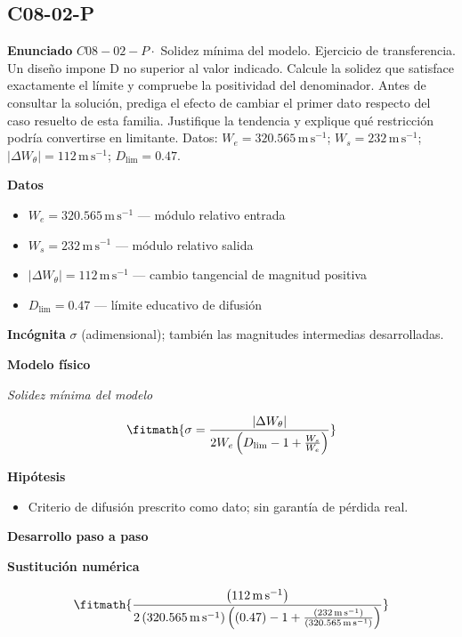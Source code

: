 \documentclass[10pt,openany]{book}
\begin{document}
\subsection*{C08-02-P}

\noindent\textbf{Enunciado}
\(C08-02-P \cdot\) Solidez mínima del modelo. Ejercicio de transferencia. Un diseño impone D no superior al valor indicado. Calcule la solidez que satisface exactamente el límite y compruebe la positividad del denominador. Antes de consultar la solución, prediga el efecto de cambiar el primer dato respecto del caso resuelto de esta familia. Justifique la tendencia y explique qué restricción podría convertirse en limitante. Datos: \(W_e=320.565\, \mathrm{m}\,\mathrm{s}^{-1}\); \(W_s=232\, \mathrm{m}\,\mathrm{s}^{-1}\); \(|\Delta W_\theta|=112\, \mathrm{m}\,\mathrm{s}^{-1}\); \(D_{\mathrm{lim}}=0.47\).

\noindent\textbf{Datos}
\begin{itemize}
\item $W_e = 320.565\,\mathrm{m}\,\mathrm{s}^{-1}$ — módulo relativo entrada
\item $W_s = 232\,\mathrm{m}\,\mathrm{s}^{-1}$ — módulo relativo salida
\item $|\Delta W_\theta| = 112\,\mathrm{m}\,\mathrm{s}^{-1}$ — cambio tangencial de magnitud positiva
\item $D_{\mathrm{lim}} = 0.47$ — límite educativo de difusión
\end{itemize}

\noindent\textbf{Incógnita}
$\sigma$ (adimensional); también las magnitudes intermedias desarrolladas.

\noindent\textbf{Modelo físico}

\noindent\textit{Solidez mínima del modelo}

\[
\fitmath{\sigma=\frac{|\Delta W_\theta|}{2 W_e \left(D_{\mathrm{lim}} - 1 + \frac{W_s}{W_e}\right)}}
\]

\noindent\textbf{Hipótesis}
\begin{itemize}
\item Criterio de difusión prescrito como dato; sin garantía de pérdida real.
\end{itemize}

\noindent\textbf{Desarrollo paso a paso}



\noindent\textbf{Sustitución numérica}

\[
\fitmath{\frac{\left(112\,\mathrm{m}\,\mathrm{s}^{-1}\right)}{2 \left(320.565\,\mathrm{m}\,\mathrm{s}^{-1}\right) \left(\left(0.47\right) - 1 + \frac{\left(232\,\mathrm{m}\,\mathrm{s}^{-1}\right)}{\left(320.565\,\mathrm{m}\,\mathrm{s}^{-1}\right)}\right)}}
\]
\end{document}
